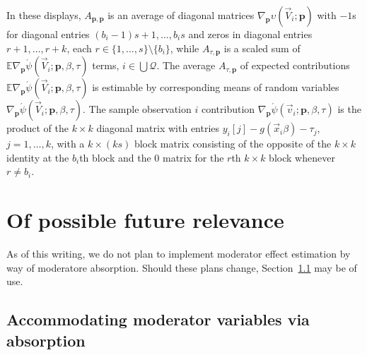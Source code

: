 \documentclass{article}
\newcommand{\absorbInterceptsEF}{\upsilon}
\begin{document}
In these displays, $A_{\mathbf{p}, \mathbf{p}}$ is
an average of diagonal matrices $\nabla_{\mathbf{p}}\absorbInterceptsEF(\vec{V}_{i};
\mathbf{p})$ with $-1$s for diagonal entries $(b_{i}-1)s+1, \ldots,
b_{i}s$ and zeros in diagonal entries $r+1, \ldots, r+k$, each
$r \in \{1, \ldots, s\}\setminus \{b_{i}\}$, while $A_{\tau,
  \mathbf{p}}$ is a scaled sum of $\mathbb{E} \nabla_{\mathbf{p}}\acute{\psi}(\vec{V}_{i};
\mathbf{p}, \beta, \tau)$ terms, $i \in \bigcup \mathcal{Q}$. The average $A_{\tau,
  \mathbf{p}}$ of expected contributions $\mathbb{E} \nabla_{\mathbf{p}}\acute{\psi}(\vec{V}_{i};
\mathbf{p}, \beta, \tau)$ is estimable by corresponding means of
random variables $\nabla_{\mathbf{p}}\acute{\psi}(\vec{V}_{i};
\mathbf{p}, \beta, \tau)$.  The sample observation $i$ contribution $\nabla_{\mathbf{p}}\acute{\psi}(\vec{v}_{i};
\mathbf{p}, \beta, \tau)$ is the product of the $k \times k$
diagonal matrix with entries $y_{i}[j] - g(\vec{x}_{i}\beta) -
\tau_{j}$, $j=1, \ldots, k$, with a $k \times (ks)$ block matrix
consisting of the opposite of the $k\times k$ identity at the
$b_{i}$th block and the 0 matrix for the $r$th $k \times k$ block whenever
$r\neq b_{i}$.

\section{Of possible future relevance}

As of this writing, we do not plan to implement moderator effect estimation by way of moderatore absorption.  Should these plans change, Section~\ref{sec:accomm-moder-vari} may be of use.
\subsection{Accommodating moderator variables via absorption}
\label{sec:accomm-moder-vari}
\end{document}
